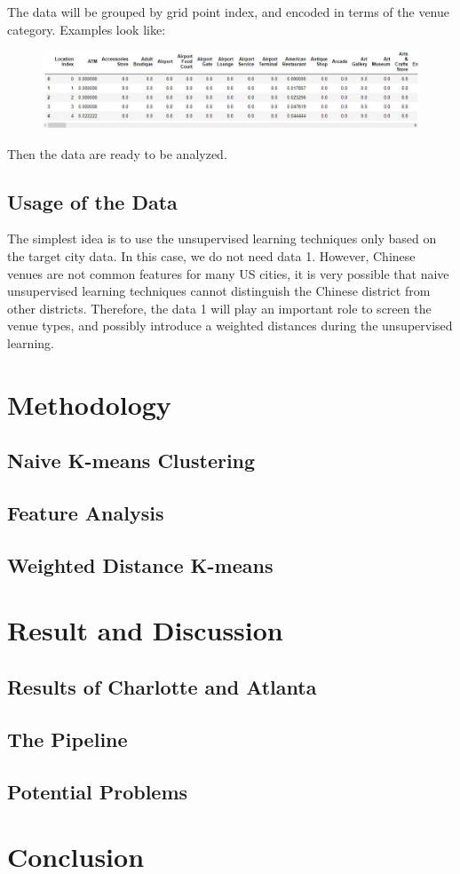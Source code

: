 \documentclass{article}
\begin{document}
\newpage

The data will be grouped by grid point index, and encoded in terms of the venue category. Examples look like:
\begin{figure}[h!]
\includegraphics[width=1.0\textwidth]{c6.jpg}
\centering
\end{figure}

Then the data are ready to be analyzed.

\subsection{Usage of the Data}

The simplest idea is to use the unsupervised learning techniques only based on the target city data.
In this case, we do not need data 1.
However, Chinese venues are not common features for many US cities, it is very possible that naive unsupervised learning techniques cannot distinguish the Chinese district from other districts.
Therefore, the data 1 will play an important role to screen the venue types, and possibly introduce a weighted distances during the unsupervised learning.

\section{Methodology}
\subsection{Naive K-means Clustering}

\subsection{Feature Analysis}

\subsection{Weighted Distance K-means}

\section{Result and Discussion}

\subsection{Results of Charlotte and Atlanta}

\subsection{The Pipeline}

\subsection{Potential Problems}

\section{Conclusion}

\newpage



\end{document}
